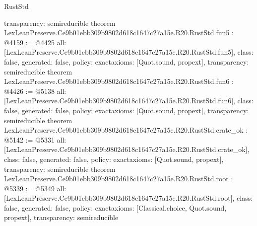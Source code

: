 \begin{lexlean}{RustStd}
\begin{coremodule}
{  transparency: semireducible
}
theorem LexLeanPreserve.Ce9b01ebb309b9802d618c1647c27a15e.R20.RustStd.fun5 : @4159 := @4425 {
  all: [LexLeanPreserve.Ce9b01ebb309b9802d618c1647c27a15e.R20.RustStd.fun5],
  class: false,
  generated: false,
  policy: exact{axioms: [Quot.sound, propext]},
  transparency: semireducible
}
theorem LexLeanPreserve.Ce9b01ebb309b9802d618c1647c27a15e.R20.RustStd.fun6 : @4426 := @5138 {
  all: [LexLeanPreserve.Ce9b01ebb309b9802d618c1647c27a15e.R20.RustStd.fun6],
  class: false,
  generated: false,
  policy: exact{axioms: [Quot.sound, propext]},
  transparency: semireducible
}
theorem LexLeanPreserve.Ce9b01ebb309b9802d618c1647c27a15e.R20.RustStd.crate_ok : @5142 := @5331 {
  all: [LexLeanPreserve.Ce9b01ebb309b9802d618c1647c27a15e.R20.RustStd.crate_ok],
  class: false,
  generated: false,
  policy: exact{axioms: [Quot.sound, propext]},
  transparency: semireducible
}
theorem LexLeanPreserve.Ce9b01ebb309b9802d618c1647c27a15e.R20.RustStd.root : @5339 := @5349 {
  all: [LexLeanPreserve.Ce9b01ebb309b9802d618c1647c27a15e.R20.RustStd.root],
  class: false,
  generated: false,
  policy: exact{axioms: [Classical.choice, Quot.sound, propext]},
  transparency: semireducible
}


\end{coremodule}
\end{lexlean}
